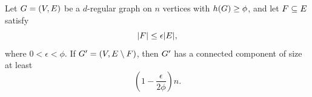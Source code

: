 \begin{proposition}
	\label{prop:edge-expander-robust-component}
	Let \(G=(V,E)\) be a \(d\)-regular graph on \(n\) vertices with \(h(G)\geq \phi\), and let \(F\subseteq E\) satisfy
	\begin{equation}
		\label{eq:edge-deletion-budget}
		\lvert F\rvert\leq \epsilon\lvert E\rvert,
	\end{equation}
	where \(0<\epsilon<\phi\). If \(G'=(V,E\setminus F)\), then \(G'\) has a connected component of size at least
	\begin{equation}
		\label{eq:robust-component-size}
		\left(1-\frac{\epsilon}{2\phi}\right)n.
	\end{equation}
\end{proposition}

